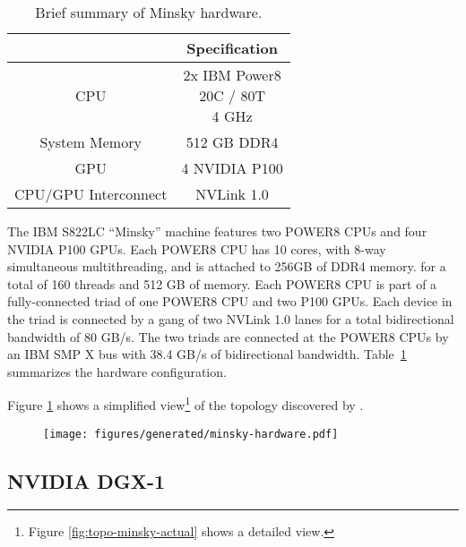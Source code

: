 
\begin{table}[]
    \centering
    \caption[Minsky hardware summary.]{
        Brief summary of Minsky hardware.
        }
    \label{tab:minsky}
    \begin{tabular}{|c|c|}
    \hline
    \textbf{} & \textbf{Specification}                              \\ \hline
    CPU           & \makecell{2x IBM Power8 \\ 20C / 80T \\ 4 GHz}  \\ \hline
    System Memory & 512 GB DDR4                                    \\ \hline
	GPU           & 4 NVIDIA P100                                   \\ \hline
	CPU/GPU Interconnect  & NVLink 1.0                                      \\ \hline
    \end{tabular}
\end{table}

The IBM S822LC ``Minsky'' machine features two POWER8 CPUs and four NVIDIA P100 GPUs\cite{caldeira2016s822lc}.
Each POWER8 CPU has 10 cores, with 8-way simultaneous multithreading, and is attached to 256GB of DDR4 memory. for a total of 160 threads and 512 GB of memory.
Each POWER8 CPU is part of a fully-connected triad of one POWER8 CPU and two P100 GPUs.
Each device in the triad is connected by a gang of two NVLink 1.0 lanes for a total bidirectional bandwidth of 80 GB/s.
The two triads are connected at the POWER8 CPUs by an IBM SMP X bus with 38.4 GB/s of bidirectional bandwidth.
Table~\ref{tab:minsky} summarizes the hardware configuration.

Figure \ref{fig:topo-minsky-simple} shows a simplified view\footnote{Figure \ref{fig:topo-minsky-actual} shows a detailed view.} of the topology discovered by .


\begin{figure}
    \centering
	\texttt{[image: figures/generated/minsky-hardware.pdf]}
    \caption[Minsky Hardware]{}
    \label{fig:topo-minsky-simple}
\end{figure}


\subsection{NVIDIA DGX-1}
\label{sec:dgx1-description}

